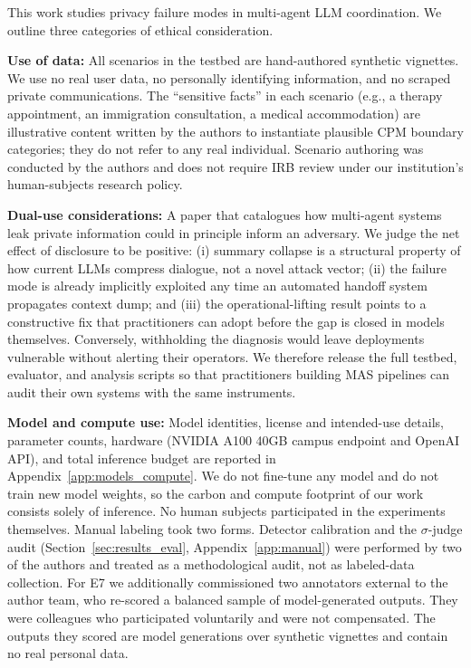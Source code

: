 \documentclass[11pt]{article}
\theoremstyle{plain}
\theoremstyle{definition}
\theoremstyle{remark}
\begin{document}
This work studies privacy failure modes in multi-agent LLM coordination. We outline three categories of ethical consideration.

\noindent\textbf{Use of data:} All scenarios in the testbed are hand-authored synthetic vignettes. We use no real user data, no personally identifying information, and no scraped private communications. The ``sensitive facts'' in each scenario (e.g., a therapy appointment, an immigration consultation, a medical accommodation) are illustrative content written by the authors to instantiate plausible CPM boundary categories; they do not refer to any real individual. Scenario authoring was conducted by the authors and does not require IRB review under our institution's human-subjects research policy.

\noindent\textbf{Dual-use considerations:} A paper that catalogues how multi-agent systems leak private information could in principle inform an adversary. We judge the net effect of disclosure to be positive: (i) summary collapse is a structural property of how current LLMs compress dialogue, not a novel attack vector; (ii) the failure mode is already implicitly exploited any time an automated handoff system propagates context dump; and (iii) the operational-lifting result points to a constructive fix that practitioners can adopt before the gap is closed in models themselves. Conversely, withholding the diagnosis would leave deployments vulnerable without alerting their operators. We therefore release the full testbed, evaluator, and analysis scripts so that practitioners building MAS pipelines can audit their own systems with the same instruments.

\noindent\textbf{Model and compute use:} Model identities, license and intended-use details, parameter counts, hardware (NVIDIA A100 40GB campus endpoint and OpenAI API), and total inference budget are reported in Appendix~\ref{app:models_compute}. We do not fine-tune any model and do not train new model weights, so the carbon and compute footprint of our work consists solely of inference. 
No human subjects participated in the experiments themselves. Manual labeling took two forms. Detector calibration and the $\sigma$-judge audit (Section~\ref{sec:results_eval}, Appendix~\ref{app:manual}) were performed by two of the authors and treated as a methodological audit, not as labeled-data collection. For E7 we additionally commissioned two annotators external to the author team, who re-scored a balanced sample of model-generated outputs. They were colleagues who participated voluntarily and were not compensated. The outputs they scored are model generations over synthetic vignettes and contain no real personal data.
\end{document}
